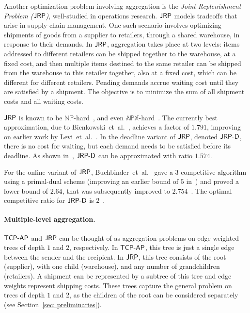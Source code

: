 \documentclass[a4paper]{article}
\newcommand{\etal}{et~al.}
\newcommand{\NP}{{\mathbb{NP}}}
\newcommand{\APX}{{\mathbb{APX}}}
\newcommand{\JRPD}{\mbox{\rm\textsf{JRP-D}}}
\newcommand{\JRP}{\mbox{\rm\textsf{JRP}}}
\newcommand{\TCPAP}{\mbox{\rm\textsf{TCP-AP}}}
\begin{document}
Another optimization problem involving aggregation is the \emph{Joint Replenishment Problem
($\JRP$)}, well-studied in operations research.
$\JRP$ models tradeoffs that arise in supply-chain management.
One such scenario involves optimizing shipments of goods from a
supplier to  retailers, through a shared warehouse, in response to their
demands.  In $\JRP$, aggregation takes place at two levels: items addressed to
different retailers can be shipped together to the warehouse, at a fixed cost,
and then multiple items destined to the same retailer can be shipped  from the warehouse to
this retailer together, also at a fixed cost, which can be  different for different
retailers. Pending demands accrue waiting cost until they are satisfied by a shipment.
The objective is to minimize the sum of all shipment costs and all waiting costs.

$\JRP$ is known to be $\NP$-hard~\cite{jrp-arkin}, and
even $\APX$-hard~\cite{jrp-deadlines-nonner,bienkowski_jrpd_2013}.
The currently best approximation,
due to Bienkowski~{\etal}~\cite{jrp-soda-2014}, achieves a factor of $1.791$,
improving on earlier work by
Levi~{\etal}~\cite{jrp-owmr-levi-soda,jrp-owmr-levi-journal,jrp-owmr-levi-approx}.
In the deadline variant of $\JRP$, denoted $\JRPD$,
there is no cost for waiting, but each demand needs to be satisfied before its deadline.
As shown in~\cite{bienkowski_jrpd_2013}, $\JRPD$ can be approximated with ratio $1.574$.

For the online variant of $\JRP$,
Buchbinder~{\etal}~\cite{jrp-online-buchbinder} gave a $3$-competitive algorithm using
a primal-dual scheme (improving an earlier bound of $5$ in~\cite{aggregation-bkv})
and proved a lower bound of $2.64$, that was subsequently
improved to $2.754$~\cite{jrp-soda-2014}.
The optimal competitive ratio for $\JRPD$ is $2$~\cite{jrp-soda-2014}.


\paragraph{Multiple-level aggregation.}  

$\TCPAP$ and $\JRP$ can be
thought of as aggregation problems on edge-weighted trees of depth $1$ and $2$,
respectively. In $\TCPAP$, this tree is just a single edge between the sender 
and the recipient. In $\JRP$, this tree consists of the root (supplier),
with one child (warehouse), and any number of grandchildren (retailers).
A shipment can be represented by a subtree of this tree and edge weights represent
shipping costs. These trees capture the general
problem on trees of depth $1$ and $2$, as the children of the root can
be considered separately (see Section~\ref{sec: preliminaries}).
\end{document}
